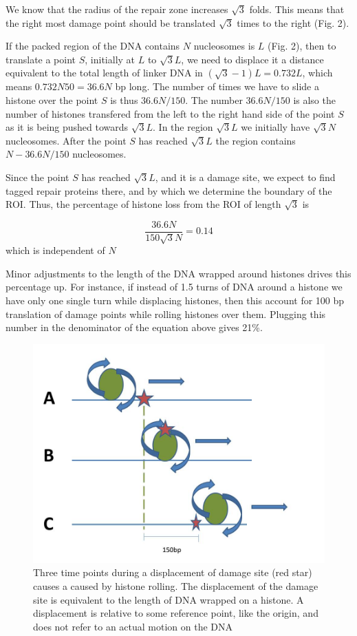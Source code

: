 \documentclass[12pt]{paper}
\begin{document}
     We know that the radius of the repair zone increases $\sqrt{3}$ folds. This means that the right most damage point should be translated $\sqrt{3}$ times to the right (Fig. 2). 

     If the packed region of the DNA contains $N$ nucleosomes is $L$ (Fig. 2), then to translate a point $S$, initially at $L$ to $\sqrt{3}L$, we need to displace it a distance equivalent to the total length of linker DNA in $(\sqrt{3}-1)L=0.732L$, which means $0.732N50=36.6N$ bp long. The number of times we have to slide a histone over the point $S$ is thus $36.6N/150$.
     The number $36.6N/150$ is also the number of histones transfered from the left to the right hand side of the point $S$ as it is being pushed towards $\sqrt{3}L$.
     In the region $\sqrt{3}L$ we initially have $\sqrt{3}N$ nucleosomes. After the point $S$ has reached $\sqrt{3}L$ the region contains $N-36.6N/150$ nucleosomes. 
     
     Since the point $S$ has reached $\sqrt{3}L$, and it is a damage site, we expect to find tagged repair proteins there, and by which we determine the boundary of the ROI. Thus, the percentage of histone loss from the ROI of length $\sqrt{3}$ is
     
     \begin{equation*}
     \frac{36.6N}{150\sqrt{3}N}=0.14
     \end{equation*}
     which is independent of $N$
          
     Minor adjustments to the length of the DNA wrapped around histones drives this percentage up. For instance, if instead of 1.5 turns of DNA around a histone we have only one single turn while displacing histones, then this account for 100 bp translation of damage points while rolling histones over them. Plugging this number in the denominator of the equation above gives 21\%. 
     
	\begin{figure}
	\centering
	\includegraphics[width=0.7\linewidth]{histoneSlidingSingle}
	\caption{{Three time points during a displacement of damage site (red star)  causes a caused by histone rolling. The displacement of the damage site is equivalent to the length of DNA wrapped on a histone. A displacement is relative to some reference point, like the origin, and does not refer to an actual motion on the DNA}}
	\label{fig:histoneSlidingSingle}
	\end{figure}
	
\end{document}
